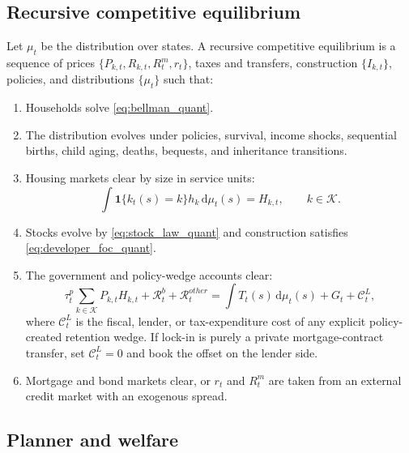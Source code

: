 \documentclass[11pt]{article}
\newcommand{\dd}{\mathrm d}
\newcommand{\1}{\mathbf 1}
\newcommand{\KK}{\mathcal K}
\begin{document}
\subsection{Recursive competitive equilibrium}

Let $\mu_t$ be the distribution over states. A recursive competitive equilibrium is a sequence of prices $\{P_{k,t},R_{k,t},R_t^m,r_t\}$, taxes and transfers, construction $\{I_{k,t}\}$, policies, and distributions $\{\mu_t\}$ such that:
\begin{enumerate}
\item Households solve \eqref{eq:bellman_quant}.
\item The distribution evolves under policies, survival, income shocks, sequential births, child aging, deaths, bequests, and inheritance transitions.
\item Housing markets clear by size in service units:
\begin{equation}
\int \1\{k_t(s)=k\}h_k\,\dd\mu_t(s)=H_{k,t},\qquad k\in\KK.
\label{eq:housing_clearing_quant}
\end{equation}
\item Stocks evolve by \eqref{eq:stock_law_quant} and construction satisfies \eqref{eq:developer_foc_quant}.
\item The government and policy-wedge accounts clear:
\begin{equation}
\tau_t^p\sum_{k\in\KK}P_{k,t}H_{k,t}+\mathcal R_t^b+\mathcal R_t^{other}=\int T_t(s)\,\dd\mu_t(s)+G_t+\mathcal C_t^L,
\label{eq:government_budget_quant}
\end{equation}
where $\mathcal C_t^L$ is the fiscal, lender, or tax-expenditure cost of any explicit policy-created retention wedge. If lock-in is purely a private mortgage-contract transfer, set $\mathcal C_t^L=0$ and book the offset on the lender side.
\item Mortgage and bond markets clear, or $r_t$ and $R_t^m$ are taken from an external credit market with an exogenous spread.
\end{enumerate}

\subsection{Planner and welfare}
\end{document}
